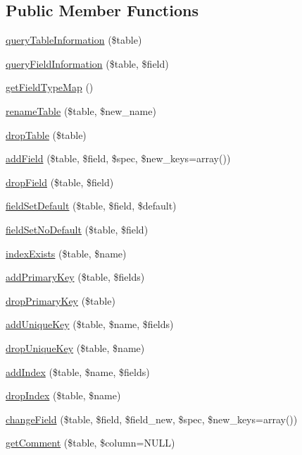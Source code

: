 \subsection*{Public Member Functions}
\begin{DoxyCompactItemize}
\item 
\hyperlink{classDatabaseSchema__pgsql_a5daa813b30b1ae806afb0831782c7d9c}{queryTableInformation} (\$table)
\item 
\hyperlink{classDatabaseSchema__pgsql_a696ce531f8a2cc71aa295353a0240d7b}{queryFieldInformation} (\$table, \$field)
\item 
\hyperlink{classDatabaseSchema__pgsql_a918cab53fb09222d7b017c527bb9534e}{getFieldTypeMap} ()
\item 
\hyperlink{classDatabaseSchema__pgsql_a899f676d802888ded3f6d4a171794f53}{renameTable} (\$table, \$new\_\-name)
\item 
\hyperlink{classDatabaseSchema__pgsql_a7d84e7dde7dfcf415b5732eb6f97fbe0}{dropTable} (\$table)
\item 
\hyperlink{classDatabaseSchema__pgsql_ad2dad402ce094b71c40136b02c70bc3f}{addField} (\$table, \$field, \$spec, \$new\_\-keys=array())
\item 
\hyperlink{classDatabaseSchema__pgsql_a08e3aef1903dc40b2f0c75d4f18507bf}{dropField} (\$table, \$field)
\item 
\hyperlink{classDatabaseSchema__pgsql_a2f17e2a4831ccba761ff37080acad92b}{fieldSetDefault} (\$table, \$field, \$default)
\item 
\hyperlink{classDatabaseSchema__pgsql_ab2d9f824a7b01c5b6ed218cd6beae1cb}{fieldSetNoDefault} (\$table, \$field)
\item 
\hyperlink{classDatabaseSchema__pgsql_aee7c3f672034280888fd9533a7c98835}{indexExists} (\$table, \$name)
\item 
\hyperlink{classDatabaseSchema__pgsql_ad6f1224f726c193393c134c975a0cd50}{addPrimaryKey} (\$table, \$fields)
\item 
\hyperlink{classDatabaseSchema__pgsql_ae1548317341c45c01e0c67f9ebd9a057}{dropPrimaryKey} (\$table)
\item 
\hyperlink{classDatabaseSchema__pgsql_a950dbc66389f5bf5028dfd6b310e4092}{addUniqueKey} (\$table, \$name, \$fields)
\item 
\hyperlink{classDatabaseSchema__pgsql_a1fd8f4f016bf0b242448dc60506ab6cf}{dropUniqueKey} (\$table, \$name)
\item 
\hyperlink{classDatabaseSchema__pgsql_afced2f073c4a42004d74b6feb1f3f46e}{addIndex} (\$table, \$name, \$fields)
\item 
\hyperlink{classDatabaseSchema__pgsql_a6c04b76c95ca7f68995baae8b0fe5b08}{dropIndex} (\$table, \$name)
\item 
\hyperlink{classDatabaseSchema__pgsql_adae800c8871e30a70f3896b730c12ed3}{changeField} (\$table, \$field, \$field\_\-new, \$spec, \$new\_\-keys=array())
\item 
\hyperlink{classDatabaseSchema__pgsql_aa500999b6f0ce930ece44f98659a7243}{getComment} (\$table, \$column=NULL)
\end{DoxyCompactItemize}
